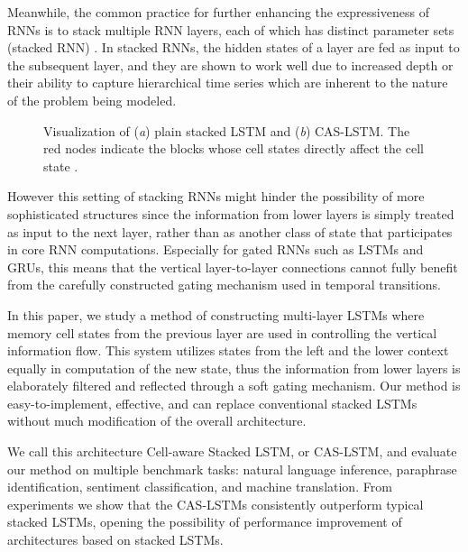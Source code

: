 \documentclass[wcp]{jmlr}
\begin{document}
    Meanwhile, the common practice for further enhancing  the expressiveness of RNNs is to stack multiple RNN layers, each of which has distinct parameter sets (stacked RNN) \citep{schmidhuber1992learning,el1996hierarchical}.
    In stacked RNNs, the hidden states of a layer are fed as input to the subsequent layer, and they are shown to work well due to increased depth \citep{pascanu2014construct} or their ability to capture hierarchical time series \citep{hermans2013training} which are inherent to the nature of the problem being modeled.
    
    \begin{figure}[tb]
        \centering
        \quad
        \caption{
            Visualization of (\textit{a}) plain stacked LSTM and (\textit{b}) CAS-LSTM.
            The red nodes indicate the blocks whose cell states directly affect the cell state .
        }
        \label{fig:comparison}
    \end{figure}
    
    However this setting of stacking RNNs might hinder the possibility of more sophisticated structures since the information from lower layers is simply treated as input to the next layer, rather than as another class of state that participates in core RNN computations.
    Especially for gated RNNs such as LSTMs and GRUs, this means that the vertical layer-to-layer connections cannot fully benefit from the carefully constructed gating mechanism used in temporal transitions.
    
    In this paper, we study a method of constructing multi-layer LSTMs where memory cell states from the previous layer are used in controlling the vertical information flow.
    This system utilizes states from the left and the lower context equally in computation of the new state, thus the information from lower layers is elaborately filtered and reflected through a soft gating mechanism. Our method is easy-to-implement, effective, and can replace conventional stacked LSTMs without much modification of the overall architecture.
    
    We call this architecture Cell-aware Stacked LSTM, or CAS-LSTM, and evaluate our method on multiple benchmark tasks: natural language inference, paraphrase identification, sentiment classification, and machine translation.
    From experiments we show that the CAS-LSTMs consistently outperform typical stacked LSTMs, opening the possibility of performance improvement of architectures based on stacked LSTMs.
    
\end{document}
